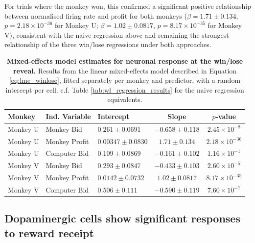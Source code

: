 For trials where the monkey won, this confirmed a significant positive relationship between normalised firing rate and profit for both monkeys ($\beta = 1.71 \pm 0.134$, $p = 2.18 \times 10^{-36}$ for Monkey U; $\beta = 1.02 \pm 0.0817$, $p = 8.17 \times 10^{-35}$ for Monkey V), consistent with the naive regression above and remaining the strongest relationship of the three win/lose regressions under both approaches.

\begin{table}[htbp]
\centering
\begin{tabular}{lllcc}
\hline
\textbf{Monkey} & \textbf{Ind. Variable} & \textbf{Intercept} & \textbf{Slope} & $p$\textbf{-value} \\
\hline
Monkey U & Monkey Bid & $0.261 \pm 0.0691$ & $-0.658 \pm 0.118$ & $2.45 \times 10^{-8}$ \\
Monkey U & Monkey Profit & $0.00347 \pm 0.0830$ & $1.71 \pm 0.134$ & $2.18 \times 10^{-36}$ \\
Monkey U & Computer Bid & $0.109 \pm 0.0869$ & $-0.161 \pm 0.102$ & $1.16 \times 10^{-1}$ \\
\hline
Monkey V & Monkey Bid & $0.293 \pm 0.0847$ & $-0.433 \pm 0.103$ & $2.60 \times 10^{-5}$ \\
Monkey V & Monkey Profit & $0.0142 \pm 0.0732$ & $1.02 \pm 0.0817$ & $8.17 \times 10^{-35}$ \\
Monkey V & Computer Bid & $0.506 \pm 0.111$ & $-0.590 \pm 0.119$ & $7.60 \times 10^{-7}$ \\
\hline
\end{tabular}
\caption[Mixed-effects model estimates for neuronal response at the win/lose reveal.]{\textbf{Mixed-effects model estimates for neuronal response at the win/lose reveal.} Results from the linear mixed-effects model described in Equation \ref{eq:lme_winlose}, fitted separately per monkey and predictor, with a random intercept per cell. c.f. Table \ref{tab:wl_regression_results} for the naive regression equivalents.}
\label{tab:lme_wl_regression_results}
\end{table}

\subsection{Dopaminergic cells show significant responses to reward receipt}

